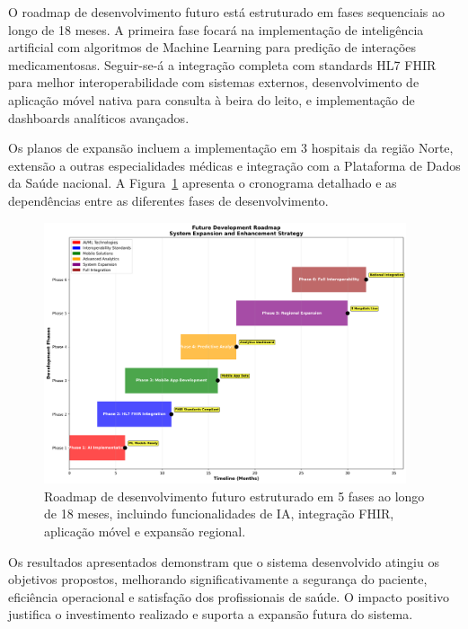 O roadmap de desenvolvimento futuro está estruturado em fases sequenciais ao longo de 18 meses. A primeira fase focará na implementação de inteligência artificial com algoritmos de Machine Learning para predição de interações medicamentosas. Seguir-se-á a integração completa com standards HL7 FHIR para melhor interoperabilidade com sistemas externos, desenvolvimento de aplicação móvel nativa para consulta à beira do leito, e implementação de dashboards analíticos avançados.

Os planos de expansão incluem a implementação em 3 hospitais da região Norte, extensão a outras especialidades médicas e integração com a Plataforma de Dados da Saúde nacional. A Figura~\ref{fig:future-roadmap} apresenta o cronograma detalhado e as dependências entre as diferentes fases de desenvolvimento.

\begin{figure}[htbp]
    \centering
    \includegraphics[width=0.95\textwidth]{images/generated/future_roadmap.png}
    \caption{Roadmap de desenvolvimento futuro estruturado em 5 fases ao longo de 18 meses, incluindo funcionalidades de IA, integração FHIR, aplicação móvel e expansão regional.}
    \label{fig:future-roadmap}
\end{figure}

Os resultados apresentados demonstram que o sistema desenvolvido atingiu os objetivos propostos, melhorando significativamente a segurança do paciente, eficiência operacional e satisfação dos profissionais de saúde. O impacto positivo justifica o investimento realizado e suporta a expansão futura do sistema. 